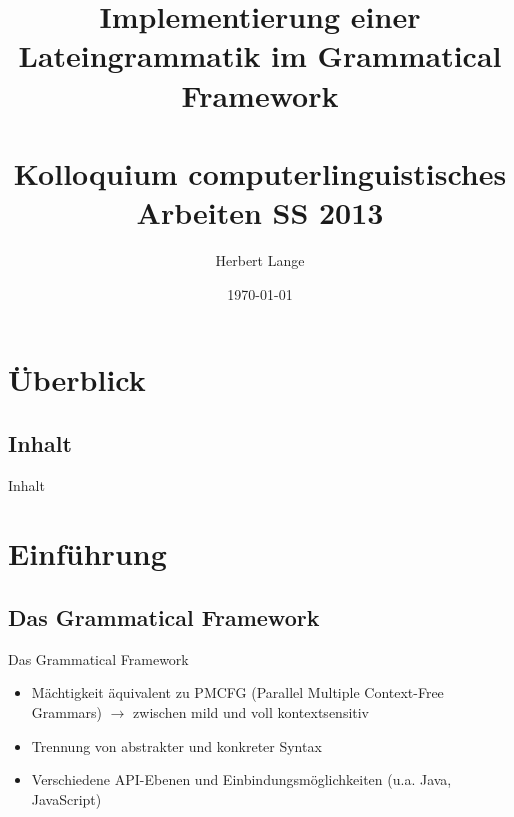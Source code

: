 \documentclass{beamer}
\title{Implementierung einer Lateingrammatik im Grammatical Framework \\ \quad \\ \large Kolloquium computerlinguistisches Arbeiten SS 2013 }
\author{Herbert Lange}
\date{\today}
\begin{document}
\frame{\titlepage}

\section*{Überblick}
\subsection*{Inhalt}
\begin{frame}{Inhalt}
\tableofcontents
\end{frame}
\section{Einführung}
\subsection{Das Grammatical Framework}
\begin{frame}[fragile]{Das Grammatical Framework}
\begin{itemize}
\item Mächtigkeit äquivalent zu PMCFG (Parallel Multiple Context-Free Grammars)
$\rightarrow$ zwischen mild und voll kontextsensitiv
\item Trennung von abstrakter und konkreter Syntax
\item Verschiedene API-Ebenen und Einbindungsmöglichkeiten (u.a. Java, JavaScript)
\end{itemize}
\end{frame}
\end{document}
